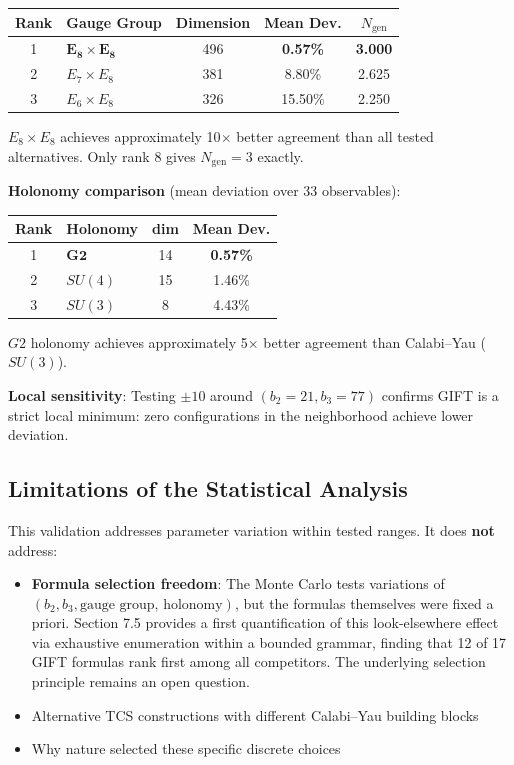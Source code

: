 \documentclass[11pt,a4paper]{article}
\newcommand{\E}{\mathrm{E}}
\newcommand{\Gtwo}{\mathrm{G}_2}
\newcommand{\SU}{\mathrm{SU}}
\def\Gtwo{G2}%
\def\E{E}%
\def\SU{SU}%
\begin{document}
\begin{table}[H]
\centering
\begin{tabular}{clccc}
\toprule
Rank & Gauge Group & Dimension & Mean Dev. & $N_{\mathrm{gen}}$ \\
\midrule
1 & $\mathbf{\E_8 \times \E_8}$ & 496 & \textbf{0.57\%} & \textbf{3.000} \\
2 & $\E_7 \times \E_8$ & 381 & 8.80\% & 2.625 \\
3 & $\E_6 \times \E_8$ & 326 & 15.50\% & 2.250 \\
\bottomrule
\end{tabular}
\end{table}

$\E_8 \times \E_8$ achieves approximately 10$\times$ better agreement than all tested alternatives. Only rank 8 gives $N_{\mathrm{gen}} = 3$ exactly.

\textbf{Holonomy comparison} (mean deviation over 33 observables):

\begin{table}[H]
\centering
\begin{tabular}{clcc}
\toprule
Rank & Holonomy & dim & Mean Dev. \\
\midrule
1 & $\mathbf{\Gtwo}$ & 14 & \textbf{0.57\%} \\
2 & $\SU(4)$ & 15 & 1.46\% \\
3 & $\SU(3)$ & 8 & 4.43\% \\
\bottomrule
\end{tabular}
\end{table}

$\Gtwo$ holonomy achieves approximately 5$\times$ better agreement than Calabi--Yau ($\SU(3)$).

\textbf{Local sensitivity}: Testing $\pm 10$ around $(b_2=21, b_3=77)$ confirms GIFT is a strict local minimum: zero configurations in the neighborhood achieve lower deviation.

\subsection{Limitations of the Statistical Analysis}

This validation addresses parameter variation within tested ranges. It does \textbf{not} address:

\begin{itemize}
\item \textbf{Formula selection freedom}: The Monte Carlo tests variations of $(b_2, b_3, \text{gauge group, holonomy})$, but the formulas themselves were fixed a priori. Section 7.5 provides a first quantification of this look-elsewhere effect via exhaustive enumeration within a bounded grammar, finding that 12 of 17 GIFT formulas rank first among all competitors. The underlying selection principle remains an open question.
\item Alternative TCS constructions with different Calabi--Yau building blocks
\item Why nature selected these specific discrete choices
\end{itemize}
\end{document}
